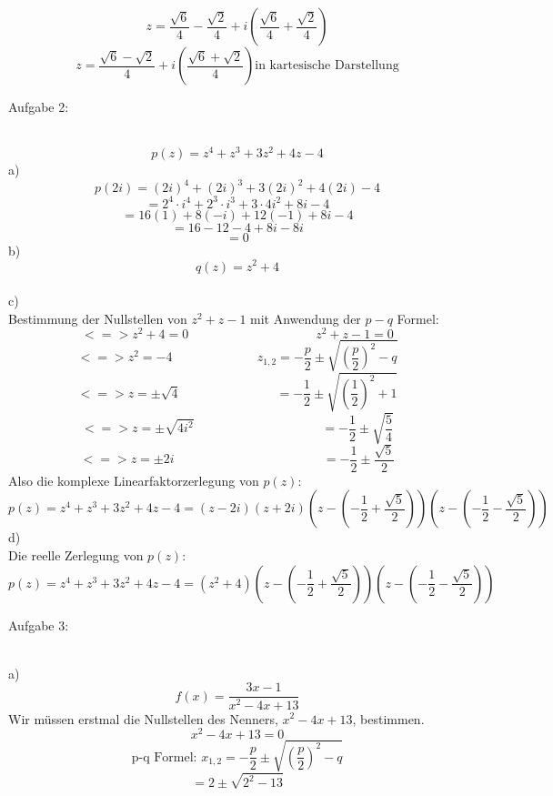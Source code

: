 \documentclass[11pt]{article}
\begin{document}
				$$z=\frac{\sqrt{6}}{4}-\frac{\sqrt{2}}{4}+i\left(\frac{\sqrt{6}}{4}+\frac{\sqrt{2}}{4}\right)$$
				$$z=\frac{\sqrt{6}-\sqrt{2}}{4}+i\left(\frac{\sqrt{6}+\sqrt{2}}{4}\right) \mbox{in kartesische Darstellung}$$
		\noindent \begin{Large}Aufgabe 2:\end{Large}\\[2pt]
				$$p(z)=z^4+z^3+3z^2+4z-4$$
			\indent a)\\
				$$p(2i)=(2i)^4+(2i)^3+3(2i)^2+4(2i)-4$$
				$$=2^4\cdot i^4+2^3\cdot i^3+3\cdot 4i^2+8i-4$$
				$$=16(1) +8(-i)+12(-1)+8i-4$$
				$$=16-12-4+8i-8i$$
				$$=0$$
			\indent b)\\
				$$q(z)=z^2+4$$
				\\
			\indent c)\\
				Bestimmung der Nullstellen von $z^2+z-1$ mit Anwendung der $p-q$ Formel:\\
				$$<=>z^2+4 =0 \hspace{120pt} z^2+z-1=0$$
				$$<=>z^2=-4 \hspace{80pt} z_{1,2}=-\frac{p}{2}\pm \sqrt{\left(\frac{p}{2}\right)^2-q}$$
				$$<=>z=\pm\sqrt{4} \hspace{90pt} =-\frac{1}{2}\pm \sqrt{\left(\frac{1}{2}\right)^2+1}$$
				$$<=>z=\pm \sqrt{4i^2} \hspace{120pt} =-\frac{1}{2}\pm \sqrt{\frac{5}{4}}$$
				$$<=>z=\pm 2i \hspace{140pt} =-\frac{1}{2} \pm \frac{\sqrt{5}}{2}$$
				Also die komplexe Linearfaktorzerlegung von $p(z)$:\\
				$$p(z)=z^4+z^3+3z^2+4z-4=(z-2i)(z+2i)(z-\left(-\frac{1}{2}+\frac{\sqrt{5}}{2}\right))(z-\left(-\frac{1}{2}-\frac{\sqrt{5}}{2}\right))$$
			\indent d)\\
				Die reelle Zerlegung von $p(z)$:\\
				$$p(z)=z^4+z^3+3z^2+4z-4=(z^2+4)(z-\left(-\frac{1}{2}+\frac{\sqrt{5}}{2}\right))(z-\left(-\frac{1}{2}-\frac{\sqrt{5}}{2}\right))$$
		\noindent \begin{Large}Aufgabe 3:\end{Large}\\[2pt]
			\indent a)\\
				$$f(x)=\frac{3x-1}{x^2-4x+13}$$
				Wir müssen erstmal die Nullstellen des Nenners, $x^2-4x+13$, bestimmen.\\
				$$x^2-4x+13=0$$
				$$\mbox{p-q Formel: } x_{1,2}=-\frac{p}{2}\pm \sqrt{\left(\frac{p}{2}\right)^2-q}$$
				$$=2\pm \sqrt{2^2-13}$$
\end{document}
